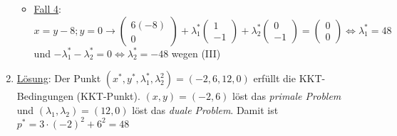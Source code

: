 \begin{enumerate}
\begin{itemize}
                \item \underline{Fall 4}: \(x=y-8; y=0 \rightarrow \begin{pmatrix}
                    6(-8)\\0
                    \end{pmatrix} + \lambda_1^* \begin{pmatrix}
                        1\\-1
                    \end{pmatrix} + \lambda_2^* \begin{pmatrix}
                        0\\-1
                    \end{pmatrix}
                     = \begin{pmatrix}
                        0\\0
                    \end{pmatrix}\Leftrightarrow \lambda_1^*=48\) und \(-\lambda_1^* - \lambda_2^* = 0 \Leftrightarrow \lambda_2^*=-48\) \Lightning \hspace{0.1em} wegen (III)
    

        \end{itemize} 
    \item \underline{Lösung}: Der Punkt \((x^*, y^*, \lambda_1^*, \lambda_2^2) = (-2, 6, 12, 0)\) erfüllt die KKT-Bedingungen (KKT-Punkt). \((x, y)=(-2,6)\) löst das \emph{primale Problem} und \((\lambda_1, \lambda_2)=(12,0)\) löst das \emph{duale Problem}. Damit ist \(p^*=3\cdot (-2)^2+6^2=48\)\\
\end{enumerate}